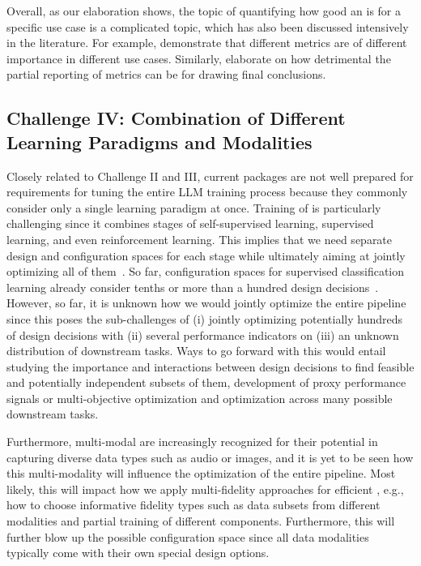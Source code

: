 Overall, as our elaboration shows, the topic of quantifying how good an \LLM is for a specific use case is a complicated topic, which has also been discussed intensively in the literature. For example, \citet{liang-tmlr23a} demonstrate that different metrics are of different importance in different \LLM use cases. Similarly, \citet{dehghani-iclr22a} elaborate on how detrimental the partial reporting of metrics can be for drawing final conclusions.

\subsection{Challenge IV: Combination of Different Learning Paradigms and Modalities}


Closely related to Challenge II and III, current \AutoML packages are not well prepared for requirements for tuning the entire LLM training process because they commonly consider only a single learning paradigm at once. Training of \LLMs is particularly challenging since it combines stages of self-supervised learning, supervised learning, and even reinforcement learning.
This implies that we need separate design and configuration spaces for each stage while ultimately aiming at jointly optimizing all of them~\cite{hutter-blog22a}. So far, configuration spaces for supervised classification learning already consider tenths or more than a hundred design decisions~\cite{feurer-aaai15a,zimmer-tpami21a,feurer-jmlr22a}. 
However, so far, it is unknown how we would jointly optimize the entire pipeline since this poses the sub-challenges of (i) jointly optimizing potentially hundreds of design decisions with (ii) several performance indicators on (iii) an unknown distribution of downstream tasks. Ways to go forward with this would entail studying the importance and interactions between design decisions to find feasible and potentially independent subsets of them, development of proxy performance signals or multi-objective optimization and optimization across many possible downstream tasks.

Furthermore, multi-modal \LLMs are increasingly recognized for their potential in capturing diverse data types such as audio or images, and it is yet to be seen how this multi-modality will influence the optimization of the entire pipeline. Most likely, this will impact how we apply multi-fidelity approaches for efficient \AutoML, e.g., how to choose informative fidelity types such as data subsets from different modalities and partial training of different components. Furthermore, this will further blow up the possible configuration space since all data modalities typically come with their own special design options.


